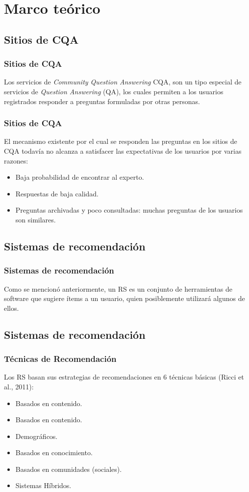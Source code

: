 \section{Marco teórico}
\subsection{Sitios de CQA}
\begin{frame}
	\frametitle{Sitios de CQA}
	Los servicios de \textit{Community Question Answering} CQA, son un tipo especial de servicios de \textit{Question Answering} (QA), los cuales permiten a los usuarios registrados responder a preguntas formuladas por otras personas.
\end{frame}

\begin{frame}
	\frametitle{Sitios de CQA}
	\scriptsize
	El mecanismo existente por el cual se responden las preguntas en los sitios de CQA todavía no alcanza a satisfacer las expectativas de los usuarios por varias razones:
	\bigskip
	\begin{itemize} [<+>]
		\item Baja probabilidad de encontrar al experto.
		\item Respuestas de baja calidad.
		\item Preguntas archivadas y poco consultadas: muchas preguntas de los usuarios son similares.
	\end{itemize}
\end{frame}

\subsection{Sistemas de recomendación}
\begin{frame}
	\frametitle{Sistemas de recomendación}
	Como se mencionó anteriormente, un RS es un conjunto de herramientas de software que sugiere ítems a un usuario, quien posiblemente utilizará algunos de ellos.
\end{frame}

\subsection{Sistemas de recomendación}
\begin{frame}
	\frametitle{Técnicas de Recomendación}
	Los RS basan sus estrategias de recomendaciones en 6 técnicas básicas (Ricci et al., 2011):
	\begin{itemize} [<+>]
		\item Basados en contenido.
		\item Basados en contenido.
		\item Demográficos.
		\item Basados en conocimiento.
		\item Basados en comunidades (sociales).
		\item Sistemas Híbridos.
	\end{itemize}
\end{frame}

